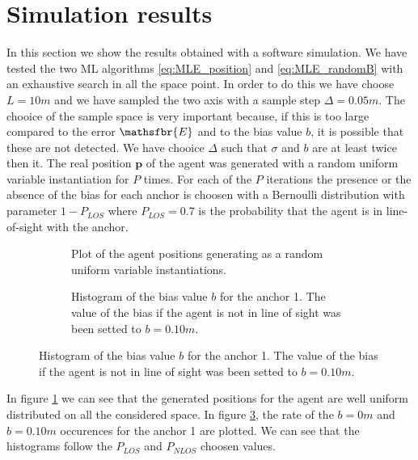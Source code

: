 \documentclass[%
    twoside, 
    a4paper
    ]{article}
\DeclareRobustCommand{\msf}[1]{%
  \ifcat\noexpand#1\relax\msfgreek{#1}\else\mathsfbr{#1}\fi%
}
\begin{document}
    \section{Simulation results}
    In this section we show the results obtained with a software simulation. We have tested the two ML algorithms
    \ref{eq:MLE_position} and \ref{eq:MLE_randomB} with an exhaustive search in all the space point. In order to 
    do this we have choose $L = 10\si{m}$ and we have sampled the two axis with a sample step $\Delta = 0.05 \si{m}$.
    The chooice of the sample space is very important because, if this is too large compared to the error $\msf{E}$
    and to the bias value $b$, it is possible that these are not detected. We have chooice $\Delta$ such that 
    $\sigma$ and $b$ are at least twice then it.
    The real position $\bm{p}$ of the agent was generated with a random uniform variable instantiation for 
    $P$ times. For each of the $P$ iterations the presence or the absence of the bias for each anchor is choosen
    with a Bernoulli distribution with parameter $1-P_{LOS}$ where $P_{LOS} = 0.7$ is the probability that the agent 
    is in line-of-sight with the anchor.
    \begin{figure}[t]
        \centering
        \begin{subfigure}[t]{0.45\linewidth}
            
            \caption{Plot of the agent positions generating as a random uniform variable instantiations.}
            \label{fig:agent_scattering}
        \end{subfigure}
        \hfill
        \begin{subfigure}[t]{0.45\linewidth}
            
            \caption{Histogram of the bias value $b$ for the anchor 1. The value of the bias if the agent 
            is not in line of sight was been setted to $b=0.10 \si{m}$.}
            \label{fig:bias_hist}
        \end{subfigure}
    \end{figure}
    In figure \ref{fig:agent_scattering} we can see that the generated positions for the agent are 
    well uniform distributed on all the considered space. In figure \ref{fig:bias_hist}, the 
    rate of the $b=0 \si{m}$ and $b=0.10 \si{m}$ occurences for the anchor 1 are plotted. We can see that the 
    histograms follow the $P_{LOS}$ and $P_{NLOS}$ choosen values.
\end{document}
